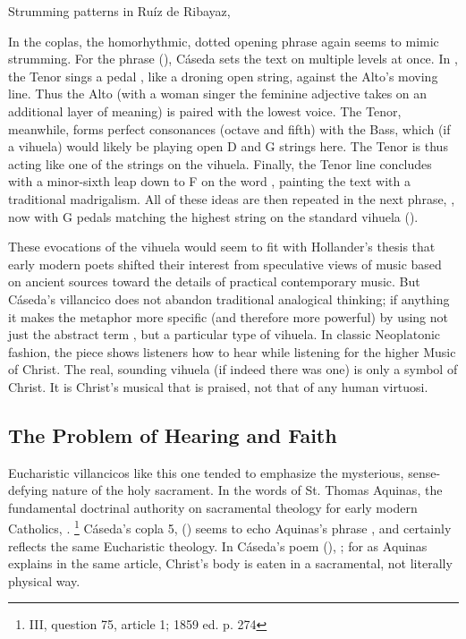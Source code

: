 {Strumming patterns in Ruíz de Ribayaz, }

In the coplas, the homorhythmic, dotted opening phrase again seems to mimic
strumming.
For the phrase  (),
Cáseda sets the text on multiple levels at once.
In , the Tenor sings a pedal , like a droning open
string, against the Alto's moving line.
Thus the  Alto (with a woman singer the feminine adjective takes
on an additional layer of meaning) is paired with the lowest voice.
The Tenor, meanwhile, forms perfect consonances (octave and fifth) with the
Bass, which (if a vihuela) would likely be playing open D and G strings here. 
The Tenor is thus acting like one of the strings on the vihuela.
Finally, the Tenor line concludes with a minor-sixth leap down to F\sh{} on the
word , painting the text with a traditional madrigalism.
All of these ideas are then repeated in the next phrase, , now
with G pedals matching the highest string on the standard vihuela
().

These evocations of the vihuela would seem to fit with Hollander's thesis that
early modern poets shifted their interest from speculative views of music based
on ancient sources toward the details of practical contemporary music.
But Cáseda's villancico does not abandon traditional analogical thinking; if
anything it makes the metaphor more specific (and therefore more powerful) by
using not just the abstract term , but a particular type of
vihuela. 
In classic Neoplatonic fashion, the piece shows listeners how to hear
 while listening for the higher Music of Christ. 
The real, sounding vihuela (if indeed there was one) is only a symbol of Christ.
It is Christ's musical  that is praised, not that of any
human virtuosi.

\subsection{The Problem of Hearing and Faith}

Eucharistic villancicos like this one tended to emphasize the mysterious,
sense-defying nature of the holy sacrament. 
In the words of St. Thomas Aquinas, the fundamental doctrinal authority on
sacramental theology for early modern Catholics, .%
    \footnote{ III, question 75, article 1; 1859 ed.
    p. 274} %
Cáseda's copla 5,  () seems to echo
Aquinas's phrase , and certainly reflects the same
Eucharistic theology.
In Cáseda's poem (), ; for as
Aquinas explains in the same article, Christ's body is eaten in a sacramental,
not literally physical way.

